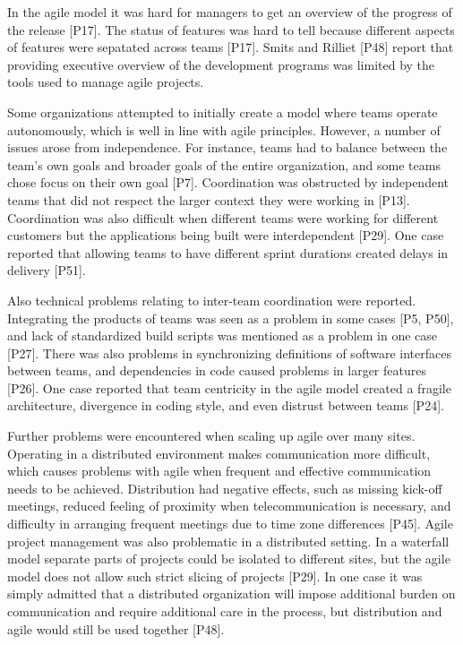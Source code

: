 \documentclass[preprint,authoryear,12pt]{elsarticle}
\begin{document}
In the agile model it was hard for managers to get an overview of the progress
of the release [P17]. The status of features was hard to tell because different
aspects of features were sepatated across teams [P17]. Smits and Rilliet [P48]
report that providing executive overview of the development programs was limited
by the tools used to manage agile projects.

Some organizations attempted to initially create a model where teams operate
autonomously, which is well in line with agile principles. However, a number of
issues arose from independence. For instance, teams had to balance between the
team's own goals and broader goals of the entire organization, and some teams
chose focus on their own goal [P7]. Coordination was obstructed by independent
teams that did not respect the larger context they were working in [P13].
Coordination was also difficult when different teams were working for different
customers but the applications being built were interdependent [P29]. One case
reported that allowing teams to have different sprint durations created delays
in delivery [P51].

Also technical problems relating to inter-team coordination were reported.
Integrating the products of teams was seen as a problem in some cases [P5, P50],
and lack of standardized build scripts was mentioned as a problem in one case
[P27].
There was also problems in synchronizing definitions of software interfaces
between teams, and dependencies in code caused problems in larger features
[P26].
One case reported that team centricity in the agile model created a fragile
architecture, divergence in coding style, and even distrust between teams [P24].

Further problems were encountered when scaling up agile over many sites.
Operating in a distributed environment makes communication more difficult, which
causes problems with agile when frequent and effective communication needs to be
achieved. Distribution had negative effects, such as missing kick-off meetings,
reduced feeling of proximity when telecommunication is necessary, and difficulty
in arranging frequent meetings due to time zone differences [P45].
Agile project management was also problematic in a distributed setting. In a
waterfall model separate parts of projects could be isolated to different sites,
but the agile model does not allow such strict slicing of projects [P29].
In one case it was simply admitted that a distributed organization will impose
additional burden on communication and require additional care in the process,
but distribution and agile would still be used together [P48].
\end{document}
